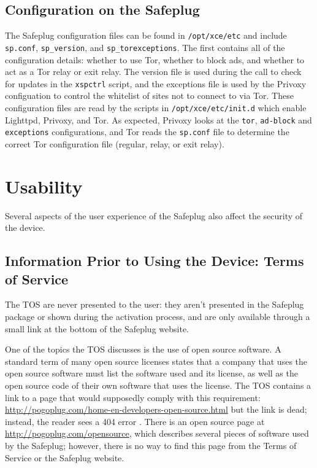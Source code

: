 \documentclass[letterpaper,twocolumn,10pt]{article}
\begin{document}
\subsection{Configuration on the Safeplug}
\label{spconfig}
The Safeplug configuration files can be found in \verb!/opt/xce/etc! and include \verb!sp.conf!, \verb!sp_version!, and \verb!sp_torexceptions!.  The first contains all of the configuration details: whether to use Tor, whether to block ads, and whether to act as a Tor relay or exit relay. The version file is used during the call to check for updates in the \verb!xspctrl! script, and the exceptions file is used by the Privoxy configuation to control the whitelist of sites not to connect to via Tor.  These configuration files are read by the scripts in \verb!/opt/xce/etc/init.d! which enable Lighttpd, Privoxy, and Tor.  As expected, Privoxy looks at the \verb!tor!, \verb!ad-block! and \verb!exceptions! configurations, and Tor reads the \verb!sp.conf! file to determine the correct Tor configuration file (regular, relay, or exit relay).

\section{Usability}
Several aspects of the user experience of the Safeplug also affect the security of the device.

\subsection{Information Prior to Using the Device: Terms of Service}
\label{tos}
The TOS are never presented to the user: they aren't presented in the Safeplug package or shown during the activation process, and are only available through a small link at the bottom of the Safeplug website\cite{safeplug}.  

One of the topics the TOS discusses is the use of open source software.  A standard term of many open source licenses states that a company that uses the open source software must list the software used and its license, as well as the open source code of their own software that uses the license.  The TOS contains a link to a page that would supposedly comply with this requirement: \url{http://pogoplug.com/home-en-developers-open-source.html} but the link is dead; instead, the reader sees a 404 error \cite{safeplug}.  There is an open source page at \url{http://pogoplug.com/opensource}, which describes several pieces of software used by the Safeplug; however, there is no way to find this page from the Terms of Service or the Safeplug website.
\end{document}
